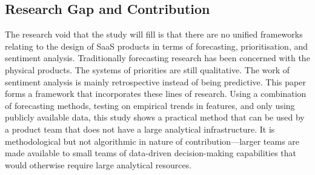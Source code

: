 \subsection{Research Gap and Contribution}
The research void that the study will fill is that there are no unified frameworks relating to the design of SaaS products in terms of forecasting, prioritisation, and sentiment analysis. Traditionally forecasting research has been concerned with the physical products. The systems of priorities are still qualitative. The work of sentiment analysis is mainly retrospective instead of being predictive. This paper forms a framework that incorporates these lines of research. Using a combination of forecasting methods, testing on empirical trends in features, and only using publicly available data, this study shows a practical method that can be used by a product team that does not have a large analytical infrastructure. It is methodological but not algorithmic in nature of contribution---larger teams are made available to small teams of data-driven decision-making capabilities that would otherwise require large analytical resources.
